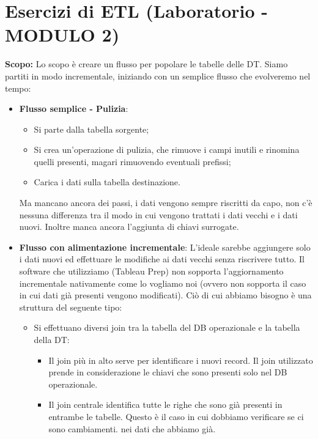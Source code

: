 \section{Esercizi di ETL (Laboratorio -  MODULO 2)}
\textbf{Scopo:}\newline
Lo scopo è creare un flusso per popolare le tabelle delle DT.\newline
Siamo partiti in modo incrementale, iniziando con un semplice flusso che evolveremo nel tempo:
\begin{itemize}
	\item \textbf{Flusso semplice - Pulizia}: \begin{itemize}
		\item Si parte dalla tabella sorgente;
		\item Si crea un'operazione di pulizia, che rimuove i campi inutili e rinomina quelli presenti, magari rimuovendo eventuali prefissi;
		\item Carica i dati sulla tabella destinazione. 
	\end{itemize}
	Ma mancano ancora dei passi, i dati vengono sempre riscritti da capo, non c'è nessuna differenza tra il modo in cui vengono trattati i dati vecchi e i dati nuovi. Inoltre manca ancora l'aggiunta di chiavi surrogate.
	\item \textbf{Flusso con alimentazione incrementale}:
	L'ideale sarebbe aggiungere solo i dati nuovi ed effettuare le modifiche ai dati vecchi senza riscrivere tutto. Il software che utilizziamo (Tableau Prep) non sopporta l'aggiornamento incrementale nativamente come lo vogliamo noi (ovvero non sopporta il caso in cui dati già presenti vengono modificati).\newline
	Ciò di cui abbiamo bisogno è una struttura del seguente tipo:
	\begin{itemize}
		\item Si effettuano diversi join tra la tabella del DB operazionale e la tabella della DT:
		\begin{itemize}
			\item Il join più in alto serve per identificare i nuovi record. Il join utilizzato prende in considerazione le chiavi che sono presenti solo nel DB operazionale.
			\item Il join centrale identifica tutte le righe che sono già presenti in entrambe le tabelle. Questo è il caso in cui dobbiamo verificare se ci sono cambiamenti. nei dati che abbiamo già.

\end{itemize}
\end{itemize}
\end{itemize}
